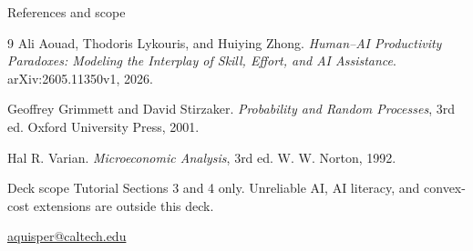 \documentclass[aspectratio=169,10pt]{beamer}
\begin{document}
\begin{frame}{References and scope}
\small
\begin{thebibliography}{9}
Ali Aouad, Thodoris Lykouris, and Huiying Zhong.
\newblock \emph{Human--AI Productivity Paradoxes: Modeling the Interplay of Skill, Effort, and AI Assistance}.
\newblock arXiv:2605.11350v1, 2026.

Geoffrey Grimmett and David Stirzaker.
\newblock \emph{Probability and Random Processes}, 3rd ed.
\newblock Oxford University Press, 2001.

Hal R. Varian.
\newblock \emph{Microeconomic Analysis}, 3rd ed.
\newblock W. W. Norton, 1992.
\end{thebibliography}
\vspace{3mm}
\begin{block}{Deck scope}
Tutorial Sections 3 and 4 only. Unreliable AI, AI literacy, and convex-cost extensions are outside this deck.
\end{block}
\vfill
\centering
\href{mailto:aquisper@caltech.edu}{aquisper@caltech.edu}
\end{frame}
\end{document}
